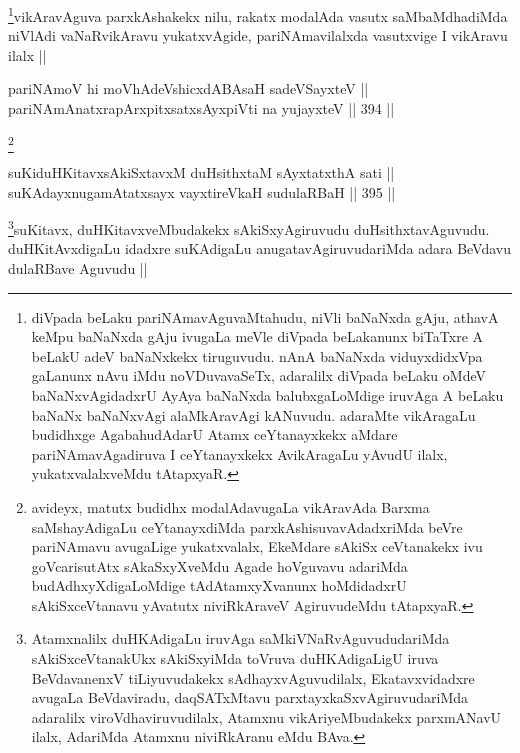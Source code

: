 \begin{artha}
\footnote{diVpada beLaku pariNAmavAguvaMtahudu, niVli baNaNxda gAju, athavA keMpu baNaNxda gAju ivugaLa meVle diVpada beLakanunx biTaTxre A beLakU adeV baNaNxkekx tiruguvudu. nAnA baNaNxda viduyxdidxVpa gaLanunx nAvu iMdu noVDuvavaSeTx, adaralilx diVpada beLaku oMdeV baNaNxvAgidadxrU AyAya baNaNxda balubxgaLoMdige iruvAga A beLaku baNaNx baNaNxvAgi alaMkAravAgi kANuvudu. adaraMte vikAragaLu budidhxge AgabahudAdarU Atamx ceYtanayxkekx aMdare pariNAmavAgadiruva I ceYtanayxkekx AvikAragaLu yAvudU ilalx, yukatxvalalxveMdu tAtapxyaR.}vikAravAguva parxkAshakekx nilu, rakatx modalAda vasutx saMbaMdhadiMda niVlAdi vaNaRvikAravu yukatxvAgide, pariNAmavilalxda vasutxvige I vikAravu ilalx ||
\end{artha}

\begin{shl}
pariNAmoV hi moVhAdeVshicxdABAsaH sadeVSayxteV || \\
pariNAmAnatxrapArxpitxsatxsAyxpiVti  na yujayxteV ||  394 ||  
\end{shl}

\begin{artha}
\footnote{avideyx, matutx budidhx modalAdavugaLa vikAravAda Barxma saMshayAdigaLu ceYtanayxdiMda parxkAshisuvavAdadxriMda beVre pariNAmavu avugaLige yukatxvalalx, EkeMdare sAkiSx ceVtanakekx ivu goVcarisutAtx sAkaSxyXveMdu Agade hoVguvavu adariMda budAdhxyXdigaLoMdige tAdAtamxyXvanunx hoMdidadxrU sAkiSxceVtanavu yAvatutx niviRkAraveV AgiruvudeMdu tAtapxyaR.}
\end{artha}


\begin{shl}
suKiduHKitavxsAkiSxtavxM duHsithxtaM sAyxtatxthA sati || \\
suKAdayxnugamAtatxsayx vayxtireVkaH sudulaRBaH ||  395 ||  
\end{shl}

\begin{artha}
\footnote{Atamxnalilx duHKAdigaLu iruvAga saMkiVNaRvAguvududariMda sAkiSxceVtanakUkx sAkiSxyiMda toVruva duHKAdigaLigU iruva BeVdavanenxV tiLiyuvudakekx sAdhayxvAguvudilalx, Ekatavxvidadxre avugaLa BeVdaviradu, daqSATxMtavu parxtayxkaSxvAgiruvudariMda adaralilx viroVdhaviruvudilalx, Atamxnu vikAriyeMbudakekx parxmANavU ilalx, AdariMda Atamxnu niviRkAranu eMdu BAva.}suKitavx, duHKitavxveMbudakekx sAkiSxyAgiruvudu duHsithxtavAguvudu. duHKitAvxdigaLu idadxre suKAdigaLu anugatavAgiruvudariMda adara BeVdavu dulaRBave Aguvudu ||
\end{artha}

